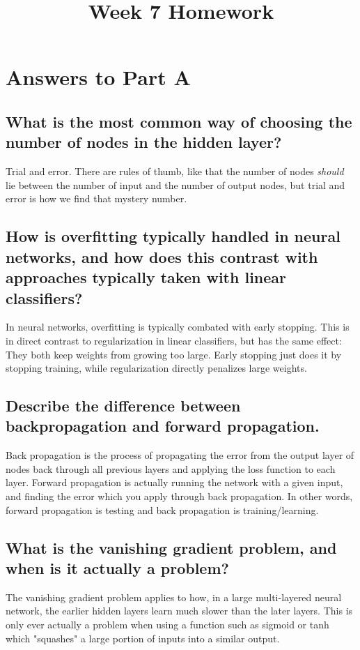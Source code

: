 \documentclass{article}
\title{Week 7 Homework}
\begin{document}
 

\section{Answers to Part A}
\subsection{What is the most common way of choosing the number of nodes in the hidden layer?}
Trial and error. There are rules of thumb, like that the number of nodes \textit{should} lie between the number of input and the number of output nodes, but trial and error is how we find that mystery number.

\subsection{How is overfitting typically handled in neural networks, and how does this contrast with approaches typically taken with linear classifiers?}
In neural networks, overfitting is typically combated with early stopping. This is in direct contrast to regularization in linear classifiers, but has the same effect: They both keep weights from growing too large. Early stopping just does it by stopping training, while regularization directly penalizes large weights. 

\subsection{Describe the difference between backpropagation and forward propagation.}
Back propagation is the process of propagating the error from the output layer of nodes back through all previous layers and applying the loss function to each layer. Forward propagation is actually running the network with a given input, and finding the error which you apply through back propagation. In other words, forward propagation is testing and back propagation is training/learning.

\subsection{What is the vanishing gradient problem, and when is it actually a problem?}
The vanishing gradient problem applies to how, in a large multi-layered neural network, the earlier hidden layers learn much slower than the later layers. This is only ever actually a problem when using a function such as sigmoid or tanh which "squashes" a large portion of inputs into a similar output. 
\end{document}

